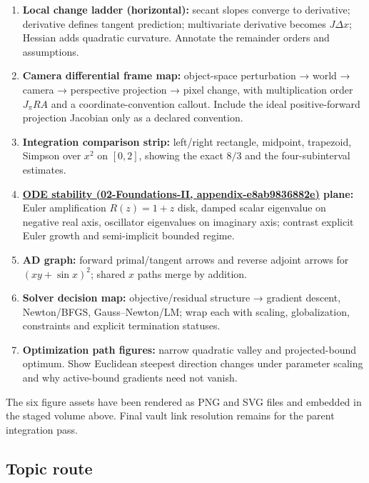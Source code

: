 \begin{enumerate}
\def\labelenumi{\arabic{enumi}.}
\tightlist
\item
  \textbf{Local change ladder (horizontal):} secant slopes converge to derivative; derivative defines tangent prediction; multivariate derivative becomes \(J\Delta x\); Hessian adds quadratic curvature. Annotate the remainder orders and assumptions.
\item
  \textbf{Camera differential frame map:} object-space perturbation → world → camera → perspective projection → pixel change, with multiplication order \(J_\pi R A\) and a coordinate-convention callout. Include the ideal positive-forward projection Jacobian only as a declared convention.
\item
  \textbf{Integration comparison strip:} left/right rectangle, midpoint, trapezoid, Simpson over \(x^2\) on \([0,2]\), showing the exact \(8/3\) and the four-subinterval estimates.
\item
  \textbf{\href{../02-Foundations-II/main.pdf\#nameddest=appendix-e8ab9836882e}{ODE stability (02-Foundations-II, appendix-e8ab9836882e)} plane:} Euler amplification \(R(z)=1+z\) disk, damped scalar eigenvalue on negative real axis, oscillator eigenvalues on imaginary axis; contrast explicit Euler growth and semi-implicit bounded regime.
\item
  \textbf{AD graph:} forward primal/tangent arrows and reverse adjoint arrows for \((xy+\sin x)^2\); shared \(x\) paths merge by addition.
\item
  \textbf{Solver decision map:} objective/residual structure → gradient descent, Newton/BFGS, Gauss--Newton/LM; wrap each with scaling, globalization, constraints and explicit termination statuses.
\item
  \textbf{Optimization path figures:} narrow quadratic valley and projected-bound optimum. Show Euclidean steepest direction changes under parameter scaling and why active-bound gradients need not vanish.
\end{enumerate}

The six figure assets have been rendered as PNG and SVG files and embedded in the staged volume above. Final vault link resolution remains for the parent integration pass.

\subsection{Topic route}\label{appendix-adf48f5dc5c1-topic-route}


